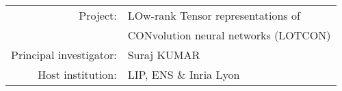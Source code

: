 
\usepackage{xspace}


%

\renewcommand{\prname}{LOTCON\xspace}

\begin{Large}
\begin{tabular}{rl}
Project: & {\sc LOw-rank Tensor representations of}\\
& {\sc CONvolution neural networks (LOTCON)}\\
Principal investigator: & Suraj KUMAR\\
Host institution:&  LIP, ENS \& Inria Lyon
\end{tabular}
\end{Large}

